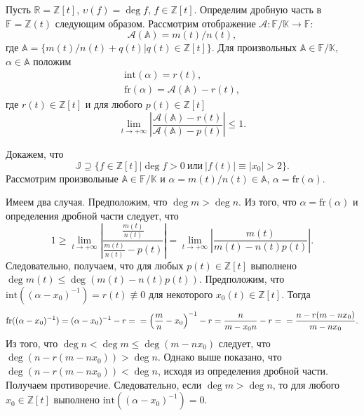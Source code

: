 \documentclass[_00_dissertation.tex]{subfiles}
\begin{document}
\begin{example}\label{example:Z[t]}
    Пусть $\mathbb{R}=\mathbb{Z}[t]$, $\upsilon(f)=\deg f$, $f \in \mathbb{Z}[t]$.
    Определим дробную часть в $\mathbb{F}=\mathbb{Z}(t)$ следующим образом.
    Рассмотрим отображение $\mathcal{A}:\mathbb{F}/\mathbb{K}\to\mathbb{F}$:
    \begin{equation*}
        \mathcal{A}(\mathbb{A})=m(t)/n(t),
    \end{equation*}
    где $\mathbb{A}=\{m(t)/n(t)+q(t)|q(t)\in\mathbb{Z}[t]\}.$
    Для произвольных $\mathbb{A}\in\mathbb{F}/\mathbb{K},$ $\alpha\in\mathbb{A}$ положим
    \begin{equation*}
        \begin{array}{c}
            \textrm{int}(\alpha)=r(t),\\
            \textrm{fr}(\alpha)=\mathcal{A}(\mathbb{A})-r(t),
        \end{array}
    \end{equation*}
    где $r(t)\in\mathbb{Z}[t]$ и для любого $p(t)\in\mathbb{Z}[t]$
    \begin{equation*}
        \lim_{t\to+\infty}\left|\frac{\mathcal{A}(\mathbb{A})-r(t)}{\mathcal{A}(\mathbb{A})-p(t)}\right|\le 1.
    \end{equation*}

    Докажем, что
    \begin{equation*}
    	\mathbb{J}\supseteq\{f\in\mathbb{Z}[t]|\deg f>0\ \textrm{или}\ |f(t)|\equiv|x_{0}|>2\}.
    \end{equation*}
    Рассмотрим произвольные $\mathbb{A}\in\mathbb{F}/\mathbb{K}$ и $\alpha=m(t)/n(t)\in\mathbb{A}$, $\alpha=\textrm{fr}(\alpha)$.

    Имеем два случая.
    Предположим, что $\deg m > \deg n$.
    Из того, что $\alpha=\textrm{fr}(\alpha)$ и определения дробной части следует, что
    \begin{equation*}
    	1 \ge \lim_{t\to+\infty}\left|\frac{\frac{m(t)}{n(t)}}{\frac{m(t)}{n(t)} - p(t)}\right| = \lim_{t\to+\infty}\left|\frac{m(t)}{m(t) - n(t)p(t)}\right|.
    \end{equation*}
	Следовательно, получаем, что для любых $p(t)\in \mathbb{Z}[t]$ выполнено $\deg m(t) \le \deg(m(t) - n(t)p(t))$.
    Предположим, что $\textrm{int}((\alpha-x_{0})^{-1})=r(t)\not\equiv0$ для некоторого $x_{0}(t)\in\mathbb{Z}[t]$.
    Тогда
    \begin{equation*}
    	\textrm{fr}((\alpha - x_{0})^{-1}) = (\alpha - x_0)^{-1} - r =\\
    	= \left(\frac{m}{n} - x_0\right)^{-1} - r = \frac{n}{m - x_0 n} - r =\\
    	= \frac{n - r(m - nx_{0})}{m - nx_{0}}.
    \end{equation*}
    Из того, что $\deg n < \deg m\le \deg(m-nx_{0})$ следует, что $\deg(n-r(m-nx_{0})) > \deg n$.
    Однако выше показано, что $\deg(n-r(m-nx_{0})) < \deg n$, исходя из определения дробной части.
    Получаем противоречие.
    Следовательно, если $\deg m > \deg n$, то для любого $x_0 \in \mathbb{Z}[t]$ выполнено $\textrm{int}((\alpha-x_{0})^{-1}) = 0$.


\end{example}
\end{document}
